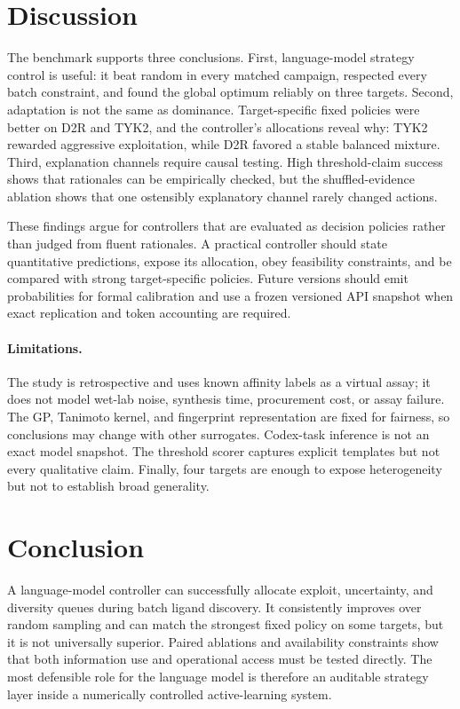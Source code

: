 \documentclass{article}
\begin{document}
\section{Discussion}

The benchmark supports three conclusions. First, language-model strategy control is useful: it beat random in every matched campaign, respected every batch constraint, and found the global optimum reliably on three targets. Second, adaptation is not the same as dominance. Target-specific fixed policies were better on D2R and TYK2, and the controller's allocations reveal why: TYK2 rewarded aggressive exploitation, while D2R favored a stable balanced mixture. Third, explanation channels require causal testing. High threshold-claim success shows that rationales can be empirically checked, but the shuffled-evidence ablation shows that one ostensibly explanatory channel rarely changed actions.

These findings argue for controllers that are evaluated as decision policies rather than judged from fluent rationales. A practical controller should state quantitative predictions, expose its allocation, obey feasibility constraints, and be compared with strong target-specific policies. Future versions should emit probabilities for formal calibration and use a frozen versioned API snapshot when exact replication and token accounting are required.

\paragraph{Limitations.}
The study is retrospective and uses known affinity labels as a virtual assay; it does not model wet-lab noise, synthesis time, procurement cost, or assay failure. The GP, Tanimoto kernel, and fingerprint representation are fixed for fairness, so conclusions may change with other surrogates. Codex-task inference is not an exact model snapshot. The threshold scorer captures explicit templates but not every qualitative claim. Finally, four targets are enough to expose heterogeneity but not to establish broad generality.

\section{Conclusion}

A language-model controller can successfully allocate exploit, uncertainty, and diversity queues during batch ligand discovery. It consistently improves over random sampling and can match the strongest fixed policy on some targets, but it is not universally superior. Paired ablations and availability constraints show that both information use and operational access must be tested directly. The most defensible role for the language model is therefore an auditable strategy layer inside a numerically controlled active-learning system.
\end{document}
